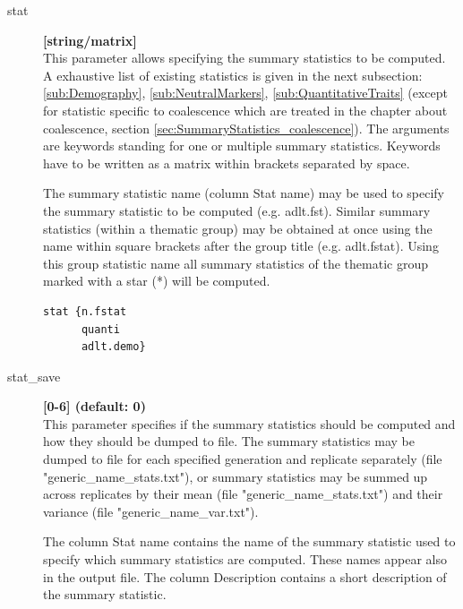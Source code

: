 \documentclass[letterpaper,12pt,oneside]{book}
\begin{document}
\begin{description}
\item[stat] \textbf{[string/matrix]}\\
This parameter allows specifying the summary statistics to be computed.  A exhaustive list of  existing statistics is given in the next subsection: \ref{sub:Demography}, \ref{sub:NeutralMarkers}, \ref{sub:QuantitativeTraits} (except for statistic specific to coalescence which are treated in the chapter about coalescence, section \ref{sec:SummaryStatistics_coalescence}). The arguments are keywords standing for one or multiple summary statistics. Keywords have to be written as a matrix within brackets separated by space. 

The summary statistic name (column \textsf{Stat name}) may be used to specify the summary statistic to be computed (e.g. \textsf{adlt.fst}). Similar summary statistics (within a thematic group) may be obtained at once using the name within square brackets after the group title (e.g. \textsf{adlt.fstat}). Using this group statistic name all summary statistics of the thematic group marked with a star (*) will be computed. 
\begin{lstlisting}[frame=single]
stat {n.fstat 
      quanti 
      adlt.demo}
\end{lstlisting}

\item[stat\_save] \textbf{[0-6] (default: 0)}\\
This parameter specifies if the summary statistics should be computed and how they should be dumped to file. The summary statistics may be dumped to file for each specified generation and replicate separately (file "generic\_name\_stats.txt"), or summary statistics may be summed up across replicates by their mean (file "generic\_name\_stats.txt") and their variance (file "generic\_name\_var.txt").

The column \textsf{Stat name} contains the name of the summary statistic used to specify which summary statistics are computed. These names appear also in the output file. The column \textsf{Description} contains a short description of the summary statistic. 



\begin{description}


\end{description}
\end{description}
\end{document}
